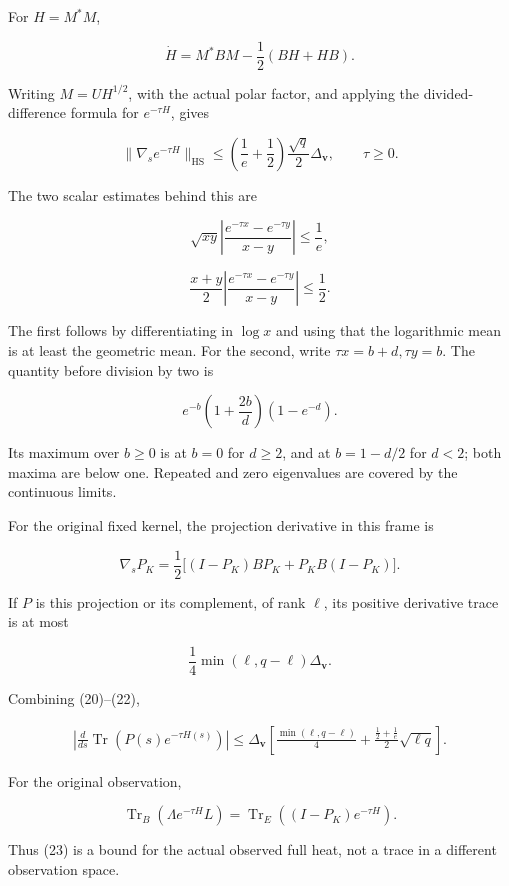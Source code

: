 \documentclass[11pt]{article}
\begin{document}
For \(H=M^*M\),

\[
\dot H=M^*BM-\frac12(BH+HB).
\]

Writing \(M=UH^{1/2}\), with the actual polar factor, and applying the divided-difference formula for \(e^{-\tau H}\), gives

\[
\boxed{
\|\nabla_s e^{-\tau H}\|_{\mathrm{HS}}
\le
\left(\frac1e+\frac12\right)
\frac{\sqrt q}{2}\Delta_{\mathbf v},
\qquad \tau\ge0.
}
\tag{20}
\]

The two scalar estimates behind this are

\[
\sqrt{xy}\left|
\frac{e^{-\tau x}-e^{-\tau y}}{x-y}
\right|\le\frac1e,
\]

\[
\frac{x+y}{2}\left|
\frac{e^{-\tau x}-e^{-\tau y}}{x-y}
\right|\le\frac12.
\tag{21}
\]

The first follows by differentiating in \(\log x\) and using that the logarithmic mean is at least the geometric mean. For the second, write \(\tau x=b+d,\tau y=b\). The quantity before division by two is

\[
e^{-b}\left(1+\frac{2b}{d}\right)(1-e^{-d}).
\]

Its maximum over \(b\ge0\) is at \(b=0\) for \(d\ge2\), and at \(b=1-d/2\) for \(d<2\); both maxima are below one. Repeated and zero eigenvalues are covered by the continuous limits.

For the original fixed kernel, the projection derivative in this frame is

\[
\nabla_sP_K
=
\frac12\bigl[(I-P_K)BP_K+P_KB(I-P_K)\bigr].
\tag{22}
\]

If \(P\) is this projection or its complement, of rank \(\ell\), its positive derivative trace is at most

\[
\frac14\min(\ell,q-\ell)\Delta_{\mathbf v}.
\]

Combining (20)--(22),

\[
\boxed{
\begin{aligned}
\left|
\frac d{ds}\operatorname{Tr}
\left(P(s)e^{-\tau H(s)}\right)
\right|
\le
\Delta_{\mathbf v}\left[
\frac{\min(\ell,q-\ell)}4
+\frac{\frac12+\frac1e}{2}\sqrt{\ell q}
\right].
\end{aligned}
}
\tag{23}
\]

For the original observation,

\[
\operatorname{Tr}_B\!\left(\Lambda e^{-\tau H}L\right)
=
\operatorname{Tr}_E\!\left((I-P_K)e^{-\tau H}\right).
\]

Thus (23) is a bound for the actual observed full heat, not a trace in a different observation space.
\end{document}
